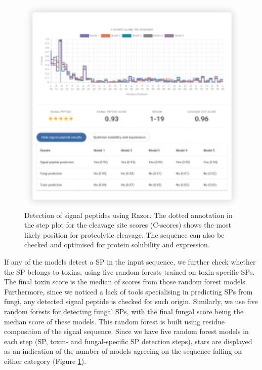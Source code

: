 \begin{figure}[!hbtp]
\includegraphics[width=1\textwidth]{chapters/TIsigner_Web/Fig/fig4.pdf}
\caption[Detection of signal
peptides using Razor.]{Detection of signal
peptides using Razor. The dotted annotation in the step plot for the
cleavage site scores (C-scores) shows the most likely position for
proteolytic cleavage. The sequence can also be checked and optimised for protein
solubility and expression.}
\label{fig:nar_webserver_fig_4}
\end{figure}


If any of the models detect a SP in the input sequence, we further check
whether the SP belongs to toxins, using five random forests trained on
toxin-specific SPs. The final toxin score is the median of scores from
those random forest models. Furthermore, since we noticed a lack of
tools specialising in predicting SPs from fungi, any detected signal
peptide is checked for such origin. Similarly, we use five random
forests for detecting fungal SPs, with the final fungal score being the
median score of these models. This random forest is built using residue composition of the signal sequence. Since we have five random forest models in
each step (SP, toxin- and fungal-specific SP detection steps), stars are displayed as an
indication of the number of models agreeing on the sequence falling on
either category (Figure \ref{fig:nar_webserver_fig_4}).

